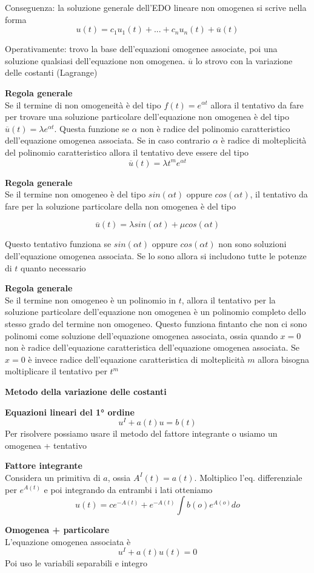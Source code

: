 \documentclass[12pt, a4paper]{article}
\begin{document}
Conseguenza: la soluzione generale dell'EDO lineare non omogenea si scrive nella forma
\[u(t)=c_{1}u_{1}(t)+...+c_{n}u_{n}(t)+\overline{u}(t)\]

Operativamente: trovo la base dell'equazioni omogenee associate, poi una soluzione qualsiasi dell'equazione
non omogenea. $\overline{u}$ lo strovo con la variazione delle costanti (Lagrange)

\textbf{Regola generale}\\Se il termine di non omogeneità è del tipo $f(t)=e^{\alpha t}$ allora il tentativo
da fare per trovare una soluzione particolare dell'equazione non omogenea è del tipo $\overline{u}(t)=\lambda
    e^{\alpha t}$. Questa funzione se $\alpha$ non è radice del polinomio caratteristico dell'equazione omogenea
associata. Se in caso contrario $\alpha$ è radice di molteplicità del polinomio caratteristico allora il
tentativo deve essere del tipo \[\overline{u}(t)=\lambda t^{m}e^{\alpha t}\]

\textbf{Regola generale}\\ Se il termine non omogeneo è del tipo $sin(\alpha t)$ oppure $cos(\alpha t)$, il tentativo
da fare per la soluzione particolare della non omogenea è del tipo

\[\overline{u}(t)=\lambda sin(\alpha t)+\mu cos(\alpha t)\]

Questo tentativo funziona se $sin(\alpha t)$ oppure $cos(\alpha t)$ non sono soluzioni dell'equazione omogenea
associata. Se lo sono allora si includono tutte le potenze di $t$ quanto necessario

\textbf{Regola generale}\\Se il termine non omogeneo è un polinomio in $t$, allora il tentativo per la soluzione
particolare dell'equazione non omogenea è un polinomio completo dello stesso grado del termine non omogeneo.
Questo funziona fintanto che non ci sono polinomi come soluzione dell'equazione omogenea associata, ossia quando
$x=0$ non è radice dell'equazione caratteristica dell'equazione omogenea associata. Se $x=0$ è invece radice
dell'equazione caratteristica di molteplicità $m$ allora bisogna moltiplicare il tentativo per $t^{m}$

\textbf{Metodo della variazione delle costanti}

\textbf{Equazioni lineari del 1° ordine}\[u^{I}+a(t)u=b(t)\]Per risolvere possiamo usare il metodo del fattore
integrante o usiamo un omogenea + tentativo

\textbf{Fattore integrante}\\Considera un primitiva di $a$, ossia $A^{I}(t)=a(t)$. Moltiplico l'eq. differenziale
per $e^{A(t)}$ e poi integrando da entrambi i lati otteniamo
\[ u(t)=ce^{-A(t)}+ e^{-A(t)}\int b(o)e^{A(o)}do\]

\textbf{Omogenea + particolare}\\L'equazione omogenea associata è \[u^{I}+a(t)u(t)=0\]Poi uso le variabili
separabili e integro
\end{document}
